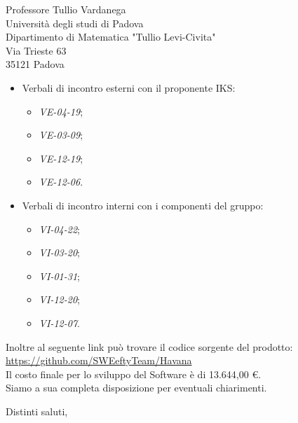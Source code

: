 \documentclass[12pt]{letter} %
\begin{document}
\begin{letter}{Professore Tullio Vardanega \\ Università degli studi di Padova \\ Dipartimento di Matematica "Tullio Levi-Civita" \\ Via Trieste 63 \\ 35121 Padova}
\begin{addmargin}[2em]{2em}
\begin{itemize}
      \item Verbali di incontro esterni con il proponente IKS: \begin{itemize}
      	\item \emph{VE-04-19};
      	\item \emph{VE-03-09};
      	\item \emph{VE-12-19};
      	\item \emph{VE-12-06}.
      \end{itemize}
      \item Verbali di incontro interni con i componenti del gruppo:
      \begin{itemize}
      	\item \emph{VI-04-22};
      	\item \emph{VI-03-20};
      	\item \emph{VI-01-31};
      	\item \emph{VI-12-20};
      	\item \emph{VI-12-07}.
      \end{itemize}
	  \end{itemize}
	  
	
	Inoltre al seguente link può trovare il codice sorgente del prodotto: \\
	\href{https://github.com/SWEeftyTeam/Havana}{https://github.com/SWEeftyTeam/Havana}\\ 

	  Il costo finale per lo sviluppo del Software è di 13.644,00 \euro.
	  \\ Siamo a sua completa disposizione per eventuali chiarimenti.
  
\end{addmargin}

\closing{Distinti saluti,}





\end{letter}
 
\end{document}
